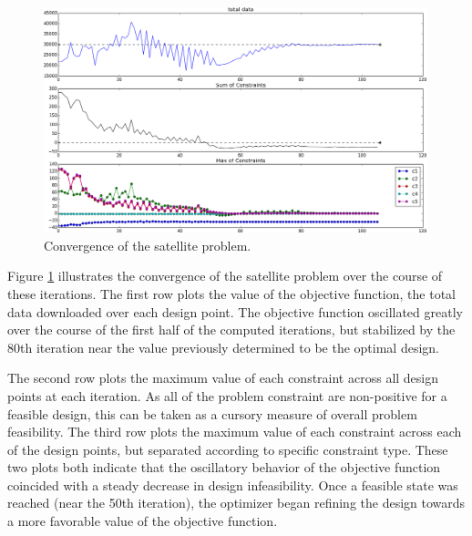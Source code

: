 \documentclass[]{aiaa-tc} %
\begin{document}
        \begin{figure}
        \centering
        \includegraphics[width=0.99\textwidth]{images/opt}
        \caption[width=0.22\textwidth]{Convergence of the satellite problem.
        \label{convergence}
        }
        \end{figure}


        Figure \ref{convergence} illustrates the convergence of the satellite problem over the course of
        these iterations. The first row plots the
        value of the objective function, the total data downloaded over each design point. The objective
        function oscillated greatly over the course of the first half of the computed iterations, but
        stabilized by the 80th iteration near the value previously determined \cite{CADRE2012}
        to be the optimal design.

        The second row plots the maximum value of each constraint across all design points at
        each iteration. As all of the problem constraint are non-positive for a feasible design,
        this can be taken as a cursory measure of overall problem feasibility.
        The third row plots the maximum value of each constraint across each of the design points,
        but separated according to specific constraint type. These two plots both indicate that the
        oscillatory behavior of the objective function coincided with a steady decrease in design
        infeasibility. Once a feasible state was reached (near the 50th iteration), the optimizer
        began refining the design towards a more favorable value of the objective function.
\end{document}
